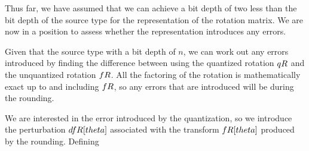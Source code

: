 Thus far, we have assumed that we can achieve a bit depth of two less than the bit depth of the source type for the representation of the rotation matrix. We are now in a position to assess whether the representation introduces any errors.

Given that the source type with a bit depth of $n$, we can work out any errors introduced by finding the difference between using the quantized rotation $\\qR$ and the unquantized rotation $\\fR$. All the factoring of the rotation is mathematically exact up to and including $\\fR$, so any errors that are introduced will be during the rounding.

We are interested in the error introduced by the quantization, so we introduce the perturbation $\\dfR[\\theta]$ associated with the transform $\\fR[\\theta]$ produced by the rounding. Defining 

